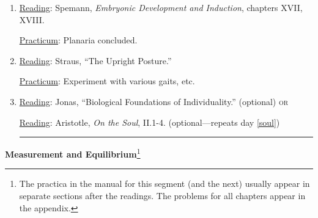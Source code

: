 \documentclass{article}
\newcommand{\rd}{\uline{Reading}}
\newcommand{\pc}{\uline{Practicum}}
\begin{document}
\begin{enumerate}
	

	\pc: Continued observation and experimentation with planaria.
\item \rd: Spemann, \emph{Embryonic Development and Induction}, chapters XVII, XVIII.

\pc: Planaria concluded.

\item \rd: Straus, ``The Upright Posture.''

\pc: Experiment with various gaits, etc.

\item \rd: Jonas, ``Biological Foundations of Individuality.'' (optional) \textsc{or} 
	 	
\rd: Aristotle, \emph{On the Soul}, II.1-4. (optional---repeats day \ref{soul}) \rule{1.2ex}{1.2ex} 
\end{enumerate}



\newpage

\thispagestyle{plain}
\pagestyle{fancy}
\fancyhead{}



\begin{center}
\textbf{Measurement and Equilibrium}\footnote{The practica in the manual for this segment (and the next) usually appear in separate sections after the readings. The problems for all chapters appear in the appendix.}
\end{center}
\end{document}
